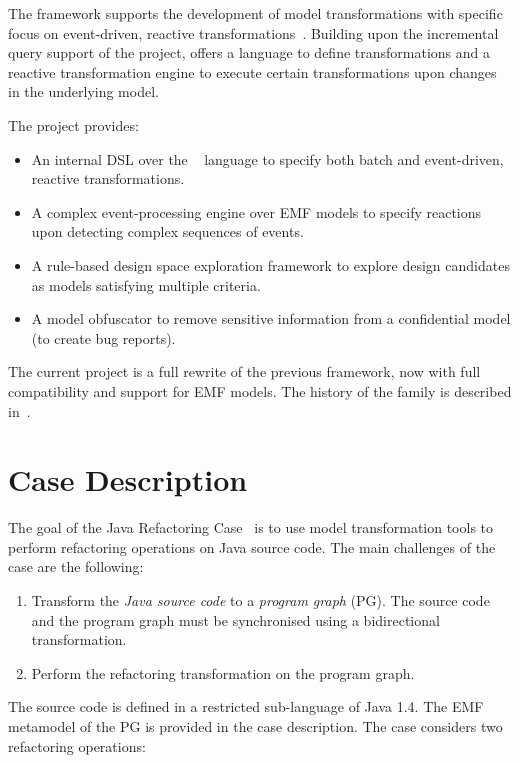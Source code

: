 \documentclass[submission,copyright,creativecommons]{eptcs}
\begin{document}
The \viatra framework supports the development of model transformations with specific focus on event-driven, reactive transformations~\cite{viatra}. Building upon the incremental query support of the \eiq project, \viatra offers a language to define transformations and a reactive transformation engine to execute certain transformations upon changes in the underlying model.

The \viatra project provides:

\begin{itemize}
	\item An internal DSL over the \xtend~\cite{Xtend} language to specify both batch and event-driven, reactive transformations.
	\item A complex event-processing engine over EMF models to specify reactions upon detecting complex sequences of events.
	\item A rule-based design space exploration framework to explore design candidates as models satisfying multiple criteria.
	\item A model obfuscator to remove sensitive information from a confidential model (\eg to create bug reports).
\end{itemize}

The current \viatra{} project is a full rewrite of the previous \viatratwo{} framework, now with full compatibility and support for EMF models. The history of the \viatra{} family is described in~\cite{viatra-history}.

\section{Case Description}

The goal of the Java Refactoring Case~\cite{ttc-refactoring-case} is to use model transformation tools to perform refactoring operations on Java source code. The main challenges of the case are the following:

\begin{enumerate}
\item Transform the \emph{Java source code} to a \emph{program graph} (PG). The source code and the program graph must be synchronised using a bidirectional transformation.
\item Perform the refactoring transformation on the program graph.
\end{enumerate}

The source code is defined in a restricted sub-language of Java 1.4. The EMF metamodel of the PG is provided in the case description. The case considers two refactoring operations:
\end{document}
